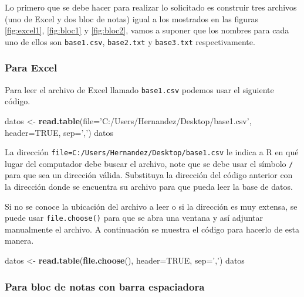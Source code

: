 \documentclass[10pt,]{krantz}
\makeatletter
\newenvironment{Shaded}{\begin{snugshade}}{\end{snugshade}}
\newcommand{\KeywordTok}[1]{\textcolor[rgb]{0.13,0.29,0.53}{\textbf{#1}}}
\newcommand{\DataTypeTok}[1]{\textcolor[rgb]{0.13,0.29,0.53}{#1}}
\newcommand{\StringTok}[1]{\textcolor[rgb]{0.31,0.60,0.02}{#1}}
\newcommand{\OtherTok}[1]{\textcolor[rgb]{0.56,0.35,0.01}{#1}}
\newcommand{\NormalTok}[1]{#1}
\let\proglang=\textsf
\newenvironment{kframe}{%
\medskip{}
\setlength{\fboxsep}{.8em}
 \def\at@end@of@kframe{}%
 \ifinner\ifhmode%
  \def\at@end@of@kframe{\end{minipage}}%
  \begin{minipage}{\columnwidth}%
 \fi\fi%
 \def\FrameCommand##1{\hskip\@totalleftmargin \hskip-\fboxsep
 \colorbox{shadecolor}{##1}\hskip-\fboxsep
     \hskip-\linewidth \hskip-\@totalleftmargin \hskip\columnwidth}%
 \MakeFramed {\advance\hsize-\width
   \@totalleftmargin\z@ \linewidth\hsize
   \@setminipage}}%
 {\par\unskip\endMakeFramed%
 \at@end@of@kframe}
\renewenvironment{Shaded}{\begin{kframe}}{\end{kframe}}
\makeatother
\begin{document}
Lo primero que se debe hacer para realizar lo solicitado es construir
tres archivos (uno de Excel y dos bloc de notas) igual a los mostrados
en las figuras \ref{fig:excel1}, \ref{fig:bloc1} y \ref{fig:bloc2},
vamos a suponer que los nombres para cada uno de ellos son
\texttt{base1.csv}, \texttt{base2.txt} y \texttt{base3.txt}
respectivamente.

\subsubsection*{Para Excel}\label{para-excel}


Para leer el archivo de Excel llamado \texttt{base1.csv} podemos usar el
siguiente código.

\begin{Shaded}
\begin{Highlighting}[]
\NormalTok{datos <-}\StringTok{ }\KeywordTok{read.table}\NormalTok{(}\DataTypeTok{file=}\StringTok{'C:/Users/Hernandez/Desktop/base1.csv'}\NormalTok{,}
                    \DataTypeTok{header=}\OtherTok{TRUE}\NormalTok{, }\DataTypeTok{sep=}\StringTok{','}\NormalTok{)}
\NormalTok{datos}
\end{Highlighting}
\end{Shaded}

La dirección
\texttt{file=\textquotesingle{}C:/Users/Hernandez/Desktop/base1.csv\textquotesingle{}}
le indica a \proglang{R} en qué lugar del computador debe buscar el
archivo, note que se debe usar el símbolo \texttt{/} para que sea un
dirección válida. Substituya la dirección del código anterior con la
dirección donde se encuentra su archivo para que pueda leer la base de
datos.

Si no se conoce la ubicación del archivo a leer o si la dirección es muy
extensa, se puede usar \texttt{file.choose()} para que se abra una
ventana y así adjuntar manualmente el archivo. A continuación se muestra
el código para hacerlo de esta manera.

\begin{Shaded}
\begin{Highlighting}[]
\NormalTok{datos <-}\StringTok{ }\KeywordTok{read.table}\NormalTok{(}\KeywordTok{file.choose}\NormalTok{(), }\DataTypeTok{header=}\OtherTok{TRUE}\NormalTok{, }\DataTypeTok{sep=}\StringTok{','}\NormalTok{)}
\NormalTok{datos}
\end{Highlighting}
\end{Shaded}

\subsubsection*{Para bloc de notas con barra
espaciadora}\label{para-bloc-de-notas-con-barra-espaciadora}
\end{document}
